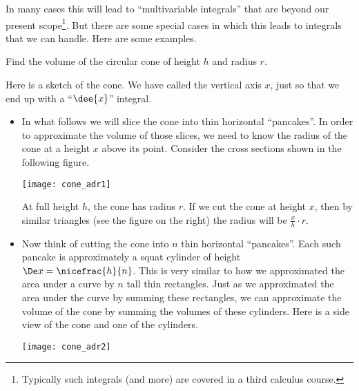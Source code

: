 In many cases this will lead to ``multivariable integrals'' that are beyond our present
scope\footnote{Typically such integrals (and more) are covered in a third calculus
course.}. But there are some special cases in which this leads to integrals that we
can handle. Here are some examples.

\begin{eg}[Cone]\label{eg:VOLa}
Find the volume of the circular cone of height $h$ and radius $r$.

\soln Here is a sketch of the cone.
We have called the vertical axis $x$, just so that we end up with a ``$\dee{x}$''
integral.

\begin{itemize}
 \item In what follows we will slice the cone into thin horizontal ``pancakes''. In order
to approximate the volume of those slices, we need to know the radius of the cone at a
height $x$ above its point. Consider the cross sections shown in the following figure.
\begin{efig}
\begin{center}
   \texttt{[image: cone\_adr1]}
\end{center}
\end{efig}
At full height $h$, the cone has radius $r$. If we cut the cone at height $x$, then by
similar triangles (see the figure on the right) the radius will be $\frac{x}{h}\cdot r$.


\item Now think of cutting the cone into $n$ thin horizontal ``pancakes''. Each such
pancake is approximately a squat cylinder of height $\De x=\nicefrac{h}{n}$. This
is very similar to how we approximated the area under a curve by $n$ tall thin
rectangles. Just as we approximated the area under the curve by summing these rectangles,
we can approximate the volume of the cone by summing the volumes of these cylinders. Here
is a side view of the cone and one of the cylinders.
\begin{efig}
\begin{center}
   \texttt{[image: cone\_adr2]}
\end{center}
\end{efig}


\end{itemize}
\end{eg}
